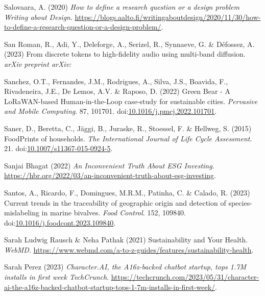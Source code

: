 \documentclass[
  letterpaper,
  DIV=11,
  numbers=noendperiod]{scrartcl}
\newlength{\cslhangindent}
\newenvironment{CSLReferences}[2] %
 {\begin{list}{}{%
  \setlength{\itemindent}{0pt}
  \setlength{\leftmargin}{0pt}
  \setlength{\parsep}{0pt}
  \ifodd #1
   \setlength{\leftmargin}{\cslhangindent}
   \setlength{\itemindent}{-1\cslhangindent}
  \fi
  \setlength{\itemsep}{#2\baselineskip}}}
 {\end{list}}
\begin{document}
\begin{CSLReferences}{0}{1}
Salovaara, A. (2020) \emph{How to define a research question or a design
problem {\textbar} {Writing} about {Design}}.
\url{https://blogs.aalto.fi/writingaboutdesign/2020/11/30/how-to-define-a-research-question-or-a-design-problem/}.

San Roman, R., Adi, Y., Deleforge, A., Serizel, R., Synnaeve, G. \&
Défossez, A. (2023) From discrete tokens to high-fidelity audio using
multi-band diffusion. \emph{arXiv preprint arXiv:}

Sanchez, O.T., Fernandes, J.M., Rodrigues, A., Silva, J.S., Boavida, F.,
Rivadeneira, J.E., De Lemos, A.V. \& Raposo, D. (2022) Green {Bear} - {A
LoRaWAN-based Human-in-the-Loop} case-study for sustainable cities.
\emph{Pervasive and Mobile Computing}. 87, 101701.
doi:\href{https://doi.org/10.1016/j.pmcj.2022.101701}{10.1016/j.pmcj.2022.101701}.

Saner, D., Beretta, C., Jäggi, B., Juraske, R., Stoessel, F. \& Hellweg,
S. (2015) {FoodPrints} of households. \emph{The International Journal of
Life Cycle Assessment}. 21.
doi:\href{https://doi.org/10.1007/s11367-015-0924-5}{10.1007/s11367-015-0924-5}.

Sanjai Bhagat (2022) \emph{An {Inconvenient Truth About ESG Investing}}.
\url{https://hbr.org/2022/03/an-inconvenient-truth-about-esg-investing}.

Santos, A., Ricardo, F., Domingues, M.R.M., Patinha, C. \& Calado, R.
(2023) Current trends in the traceability of geographic origin and
detection of species-mislabeling in marine bivalves. \emph{Food
Control}. 152, 109840.
doi:\href{https://doi.org/10.1016/j.foodcont.2023.109840}{10.1016/j.foodcont.2023.109840}.

Sarah Ludwig Rausch \& Neha Pathak (2021) Sustainability and {Your
Health}. \emph{WebMD}.
\url{https://www.webmd.com/a-to-z-guides/features/sustainability-health}.

Sarah Perez (2023) \emph{Character.{AI}, the A16z-backed chatbot
startup, tops 1.{7M} installs in first week {\textbar} {TechCrunch}}.
\url{https://techcrunch.com/2023/05/31/character-ai-the-a16z-backed-chatbot-startup-tops-1-7m-installs-in-first-week/}.


\end{CSLReferences}
\end{document}

